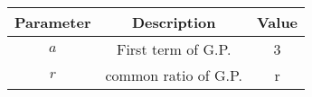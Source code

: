 \begin{tabular}{|c|c|c|}
    \hline
    \textbf{Parameter} & \textbf{Description} & \textbf{Value} \\
    \hline
    $a$ & First term of G.P. & 3 \\
    \hline
    $r$ & common ratio of G.P. & r \\
    \hline
\end{tabular}

